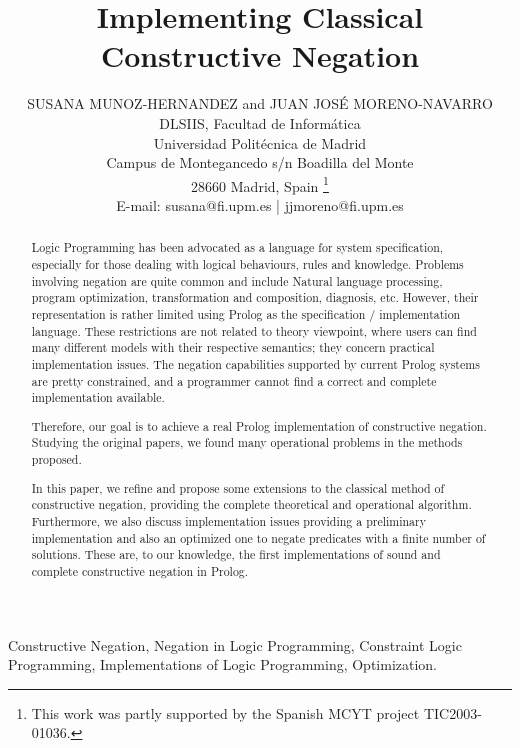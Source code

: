 \documentclass{tlp}
\begin{document}


\long{}


\title{Implementing Classical Constructive Negation}

\author[S. Munoz-Hernandez and J.J. Moreno-Navarro]
{SUSANA MUNOZ-HERNANDEZ and JUAN JOS\'{E} MORENO-NAVARRO \\
DLSIIS, Facultad de Inform\'{a}tica \\
Universidad Polit\'{e}cnica de  Madrid \\ 
Campus de Montegancedo s/n Boadilla del Monte\\
28660 Madrid, Spain \footnote{This work was partly supported by the
Spanish MCYT project TIC2003-01036.} \\
E-mail: susana@fi.upm.es | jjmoreno@fi.upm.es
}

\pagerange{\pageref{firstpage}--\pageref{lastpage}}
\setcounter{page}{1}

\maketitle

\label{firstpage}

\begin{abstract}
%
  Logic Programming has been advocated as a language for system specification,
  especially for those dealing with logical behaviours, rules and
  knowledge. Problems involving negation are quite common and include
  Natural language processing, program optimization, transformation
  and composition, diagnosis, etc. However, their
  representation is rather limited using Prolog as the specification /
  implementation language. These restrictions are not related to theory
  viewpoint, where users can find many different models with their respective
  semantics; they concern practical implementation issues. The negation
  capabilities supported by current Prolog systems are pretty constrained, and
  a programmer cannot find a correct and complete implementation available.

  Therefore, our goal is to achieve a real Prolog implementation of
  constructive negation. Studying the original papers, we found many operational problems in the
  methods proposed.
 
In this paper, we refine and propose some extensions to the classical method
  of constructive negation, providing the complete theoretical and operational
  algorithm. Furthermore, we also discuss implementation issues providing a
  preliminary implementation and also an optimized one to negate predicates
  with a finite number of solutions. These are, to our knowledge, the first
  implementations of sound and complete constructive negation in Prolog.
\end{abstract}
\begin{keywords}
Constructive Negation, Negation in Logic Programming, Constraint Logic
Programming, Implementations of Logic Programming, Optimization.
\end{keywords}
\end{document}
